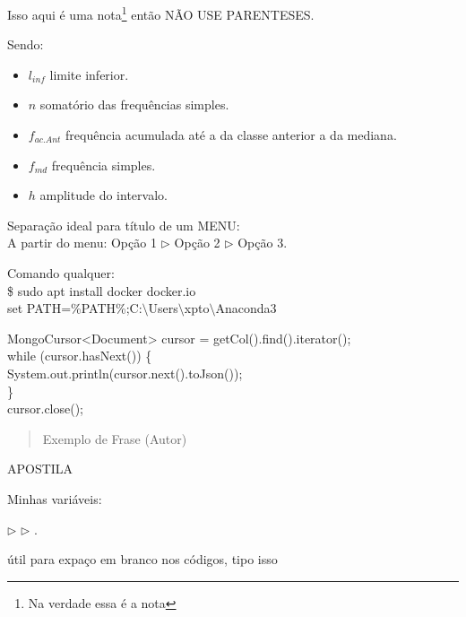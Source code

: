 \documentclass[a4paper,11pt]{article}
\begin{document}
Isso aqui é uma nota\footnote{Na verdade essa é a nota} então NÃO USE PARENTESES.

Sendo: \vspace{-1em}
\begin{itemize}[nolistsep]
	\item $l_{inf}$ limite inferior.
	\item $n$ somatório das frequências simples.
	\item $f_{ac.Ant}$ frequência acumulada até a da classe anterior a da mediana.
	\item $f_{md}$ frequência simples.
	\item $h$ amplitude do intervalo.
\end{itemize}

Separação ideal para título de um MENU: \\
A partir do menu: Opção 1 $\triangleright$ Opção 2 $\triangleright$ Opção 3.

Comando qualquer: \\
{\ttfamily\$ sudo apt install docker docker.io} \\
{\ttfamily set PATH=\%PATH\%;C:$\setminus$Users$\setminus$xpto$\setminus$Anaconda3}

{\ttfamily MongoCursor<Document> cursor = getCol().find().iterator(); \\
	while (cursor.hasNext()) \{ \\
	\phantom{x}\hspace{4pt} System.out.println(cursor.next().toJson()); \\
	\} \\
	cursor.close(); }

\begin{quotation}
	Exemplo de Frase (Autor)
\end{quotation}

APOSTILA

\begin{theo}[]{}
	\lipsum[4-1]
\end{theo}

\begin{theo}{}
	\lipsum[4-1]
\end{theo}

Minhas variáveis:

 $\triangleright$  $\triangleright$ .

\aspas{ } útil para expaço em branco nos códigos, tipo isso

\end{document}
